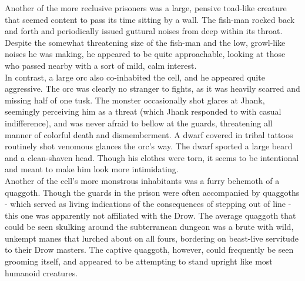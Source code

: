 \documentclass[letterpaper,10pt,twoside,twocolumn,openany]{book}
\begin{document}
Another of the more reclusive prisoners was a large, pensive toad-like creature that seemed content to pass its time sitting by a wall. The fish-man rocked back and forth and periodically issued guttural noises from deep within its throat. Despite the somewhat threatening size of the fish-man and the low, growl-like noises he was making, he appeared to be quite approachable, looking at those who passed nearby with a sort of mild, calm interest.\\

In contrast, a large orc also co-inhabited the cell, and he appeared quite aggressive. The orc was clearly no stranger to fights, as it was heavily scarred and missing half of one tusk. The monster occasionally shot glares at Jhank, seemingly perceiving him as a threat (which Jhank responded to with casual indifference), and was never afraid to bellow at the guards, threatening all manner of colorful death and dismemberment. A dwarf covered in tribal tattoos routinely shot venomous glances the orc's way. The dwarf sported a large beard and a clean-shaven head. Though his clothes were torn, it seems to be intentional and meant to make him look more intimidating.\\


Another of the cell's more monstrous inhabitants was a furry behemoth of a quaggoth. Though the guards in the prison were often accompanied by quaggoths - which served as living indications of the consequences of stepping out of line - this one was apparently not affiliated with the Drow. The average quaggoth that could be seen skulking around the subterranean dungeon was a brute with wild, unkempt manes that lurched about on all fours, bordering on beast-live servitude to their Drow masters. The captive quaggoth, however, could frequently be seen grooming itself, and appeared to be attempting to stand upright like most humanoid creatures.\\
\end{document}
